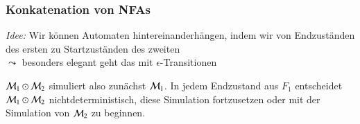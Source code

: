 \documentclass[onlymath]{beamer}
\begin{document}
\begin{frame}\frametitle{Konkatenation von NFAs}

\emph{Idee:} Wir können Automaten hintereinanderhängen, indem wir von Endzuständen des ersten
zu Startzuständen des zweiten \\
$\leadsto$ besonders elegant geht das mit $\epsilon$-Transitionen
\bigskip


$\mathcal{M}_1\odot\mathcal{M}_2$ simuliert also zunächst $\mathcal{M}_1$. In jedem Endzustand aus $F_1$ entscheidet
$\mathcal{M}_1\odot\mathcal{M}_2$ nichtdeterministisch, diese Simulation fortzusetzen oder mit der Simulation von $\mathcal{M}_2$ zu beginnen.

\end{frame}
\end{document}
